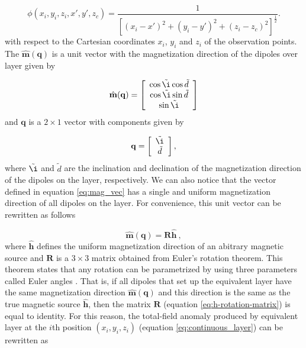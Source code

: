 \begin{equation}
\phi (x_i,y_i,z_i,x',y',z_c) = \frac{1}{[(x_i-x')^2 + (y_i-y')^2 + (z_i-z_c)^2]^{\frac{1}{2}}} .
\label{eq:phi}
\end{equation}
with respect to the Cartesian coordinates $x_i$, $y_i$ and $z_i$ of the observation points. The $\hat{\mathbf{m}}(\mathbf{q})$ is a unit vector with the magnetization direction of the dipoles over layer given by 

\begin{equation}
	\hat{\mathbf{m}}(\mathbf{q}) =
	\left[ \begin{array}{c}
		\cos \tilde{\i} \cos \tilde{d} \\
		\cos \tilde{\i} \sin \tilde{d}\\
		\sin \tilde{\i}
	\end{array} \right] 
	\label{eq:mag_vec}
\end{equation}
and $\mathbf{q}$ is a $2 \times 1$ vector with components given by 

\begin{equation}
	\mathbf{q} =
	\left[ \begin{array}{c}
		\tilde{\i} \\ 
		\tilde{d} 
	\end{array} \right] ,
	\label{eq:q_vector}
\end{equation}
where $\tilde{\i} $ and $\tilde{d} $ are the inclination and declination of the magnetization direction of the dipoles on the layer, respectively. We can also notice that the vector defined in equation \ref{eq:mag_vec} has a single and uniform magnetization direction of all dipoles on the layer. For convenience, this unit vector can be rewritten as follows

\begin{equation}
\hat{\mathbf{m}}(\mathbf{q}) = \mathbf{R}\hat{\mathbf{h}} \: ,
\label{eq:h-rotation-matrix}
\end{equation}
where $\hat{\mathbf{h}}$ defines the uniform magnetization direction of an abitrary magnetic source and $\mathbf{R}$ is a $3 \times 3$ matrix obtained from Euler's rotation theorem. This theorem states that any rotation can be parametrized by using three parameters called Euler angles \citep{goldstein1980}. That is, if all dipoles that set up the equivalent layer have the same magnetization direction $\hat{\mathbf{m}}(\mathbf{q})$ and this direction is the same as the true magnetic source $\hat{\mathbf{h}}$, then the matrix $\mathbf{R}$ (equation \ref{eq:h-rotation-matrix}) is equal to identity. For this reason, the total-field anomaly produced by equivalent layer at the $i$th position $(x_i,y_i,z_i)$ (equation \ref{eq:continuous_layer}) can be rewritten as 

